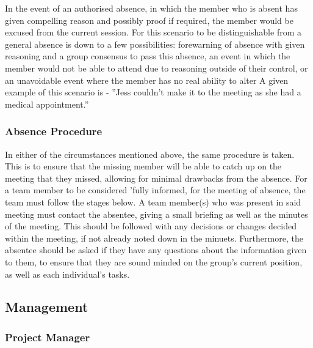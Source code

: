 \documentclass[
  english,
  a4paper,
,tablecaptionabove
]{scrartcl}
\begin{document}
In the event of an authorised absence, in which the member who is absent
has given compelling reason and possibly proof if required, the member
would be excused from the current session. For this scenario to be
distinguishable from a general absence is down to a few possibilities:
forewarning of absence with given reasoning and a group consensus to
pass this absence, an event in which the member would not be able to
attend due to reasoning outside of their control, or an unavoidable
event where the member has no real ability to alter A given example of
this scenario is - ''Jess couldn't make it to the meeting as she had a
medical appointment.''

\hypertarget{absence-procedure}{%
\subsubsection{Absence Procedure}\label{absence-procedure}}

In either of the circumstances mentioned above, the same procedure is
taken. This is to ensure that the missing member will be able to catch
up on the meeting that they missed, allowing for minimal drawbacks from
the absence. For a team member to be considered 'fully informed, for the
meeting of absence, the team must follow the stages below. A team
member(s) who was present in said meeting must contact the absentee,
giving a small briefing as well as the minutes of the meeting. This
should be followed with any decisions or changes decided within the
meeting, if not already noted down in the minuets. Furthermore, the
absentee should be asked if they have any questions about the
information given to them, to ensure that they are sound minded on the
group's current position, as well as each individual's tasks.

\hypertarget{management}{%
\subsection{Management}\label{management}}

\hypertarget{project-manager}{%
\subsubsection{Project Manager}\label{project-manager}}
\end{document}
